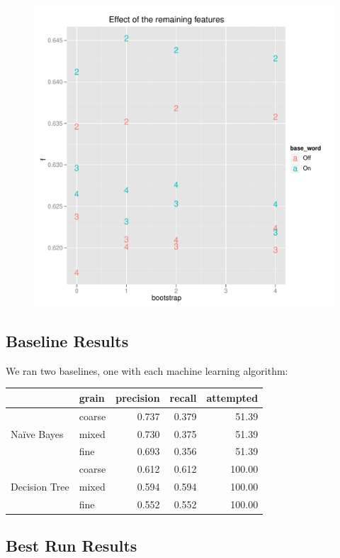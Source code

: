 \documentclass{article}
\newcommand{\Naive}{Na\"ive}
\begin{document}
\begin{figure}[H]
\includegraphics[width=\textwidth]{pg_0004}
\caption{\label{fig4}}
\end{figure}

\subsection{Baseline Results}

We ran two baselines, one with each machine learning algorithm:

\begin{tabular}{l l | r r r}
& grain& precision& recall& attempted\\
\hline
\multirow{3}{*}{\Naive{} Bayes} &
coarse  &  0.737 & 0.379 &   51.39\\
&mixed  &  0.730 & 0.375 &   51.39\\
& fine  &  0.693 & 0.356 &   51.39\\
\multirow{3}{*}{Decision Tree} &
coarse  &  0.612 & 0.612 &  100.00\\
&mixed  &  0.594 & 0.594 &  100.00\\
& fine  &  0.552 & 0.552 &  100.00\\
\end{tabular}

\subsection{Best Run Results}
\end{document}
